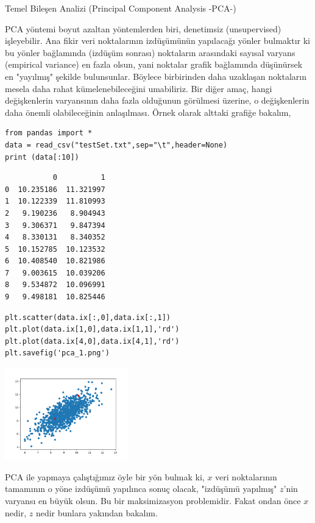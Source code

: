 \documentclass[12pt,fleqn]{article}\usepackage{../../common}
\begin{document}
Temel Bileşen Analizi (Principal Component Analysis -PCA-)

PCA yöntemi boyut azaltan yöntemlerden biri, denetimsiz (unsupervised)
işleyebilir. Ana fikir veri noktalarının izdüşümünün yapılacağı yönler
bulmaktır ki bu yönler bağlamında (izdüşüm sonrası) noktaların arasındaki
sayısal varyans (empirical variance) en fazla olsun, yani noktalar grafik
bağlamında düşünürsek en "yayılmış" şekilde bulunsunlar. Böylece
birbirinden daha uzaklaşan noktaların mesela daha rahat kümelenebileceğini
umabiliriz.  Bir diğer amaç, hangi değişkenlerin varyansının daha fazla
olduğunun görülmesi üzerine, o değişkenlerin daha önemli olabileceğinin
anlaşılması. Örnek olarak alttaki grafiğe bakalım,

\begin{verbatim}
from pandas import *
data = read_csv("testSet.txt",sep="\t",header=None)
print (data[:10])
\end{verbatim}

\begin{verbatim}
           0          1
0  10.235186  11.321997
1  10.122339  11.810993
2   9.190236   8.904943
3   9.306371   9.847394
4   8.330131   8.340352
5  10.152785  10.123532
6  10.408540  10.821986
7   9.003615  10.039206
8   9.534872  10.096991
9   9.498181  10.825446
\end{verbatim}

\begin{verbatim}
plt.scatter(data.ix[:,0],data.ix[:,1])
plt.plot(data.ix[1,0],data.ix[1,1],'rd')
plt.plot(data.ix[4,0],data.ix[4,1],'rd')
plt.savefig('pca_1.png')
\end{verbatim}

\includegraphics[height=4cm]{pca_1.png}

PCA ile yapmaya çalıştığımız öyle bir yön bulmak ki, $x$ veri
noktalarının tamamının o yöne izdüşümü yapılınca sonuç olacak,
"izdüşümü yapılmış" $z$'nin varyansı en büyük olsun. Bu bir
maksimizasyon problemidir. Fakat ondan önce $x$ nedir, $z$ nedir
bunlara yakından bakalım.
\end{document}
